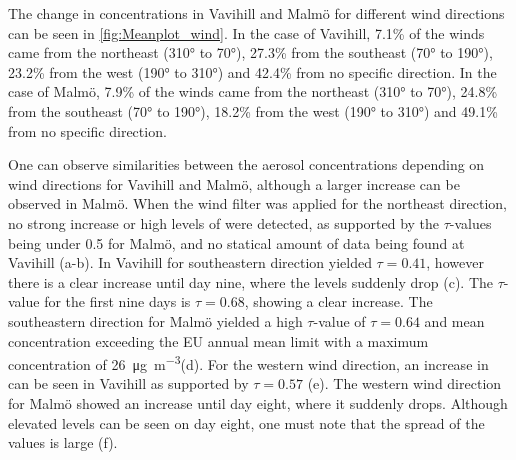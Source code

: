 The change in \PM concentrations in Vavihill and Malmö for different wind directions can be seen in \autoref{fig:Meanplot_wind}. In the case of Vavihill, 7.1\% of the winds came from the northeast (310° to 70°), 27.3\% from the southeast (70° to 190°), 23.2\% from the west (190° to 310°) and 42.4\% from no specific direction. In the case of Malmö, 7.9\% of the winds came from the northeast (310° to 70°), 24.8\% from the southeast (70° to 190°), 18.2\% from the west (190° to 310°) and 49.1\% from no specific direction. 


One can observe similarities between the aerosol concentrations depending on wind directions for Vavihill and Malmö, although a larger increase can be observed in Malmö. When the wind filter was applied for the northeast direction, no strong increase or high levels of \PM were detected, as supported by the $\tau$-values being under 0.5 for Malmö, and no statical amount of data being found at Vavihill (a-b). In Vavihill for southeastern direction yielded $\tau=0.41$, however there is a clear increase until day nine, where the levels suddenly drop (c). The $\tau$-value for the first nine days is $\tau=0.68$, showing a clear increase. The southeastern direction for Malmö yielded a high $\tau$-value of $\tau=0.64$ and mean concentration exceeding the EU annual mean limit with a maximum concentration of \SI{26}{\micro\gram\per\meter\cubed}(d). For the western wind direction, an increase in \PM can be seen in Vavihill as supported by $\tau=0.57$ (e). The western wind direction for Malmö showed an increase until day eight, where it suddenly drops. Although elevated levels can be seen on day eight, one must note that the spread of the values is large (f). 

